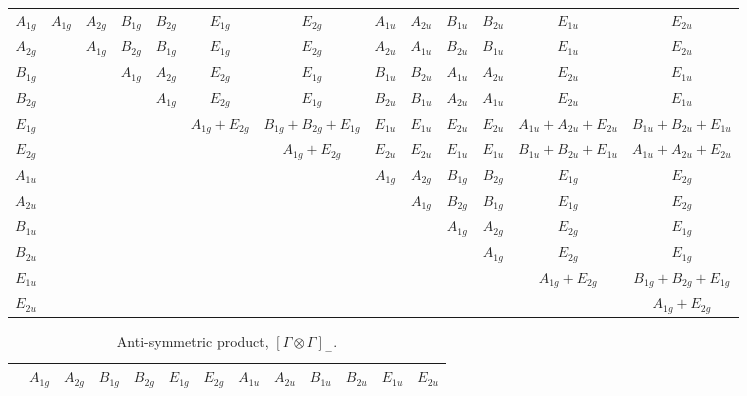 \documentclass[fleqn,10pt,landscape]{article}
\begin{document}
\begin{itemize}
\begin{center}
\begin{longtable}{c|cccccccccccc}
$ A_{1g} $ & $ A_{1g} $ & $ A_{2g} $ & $ B_{1g} $ & $ B_{2g} $ & $ E_{1g} $ & $ E_{2g} $ & $ A_{1u} $ & $ A_{2u} $ & $ B_{1u} $ & $ B_{2u} $ & $ E_{1u} $ & $ E_{2u} $ \\
$ A_{2g} $ & $  $ & $ A_{1g} $ & $ B_{2g} $ & $ B_{1g} $ & $ E_{1g} $ & $ E_{2g} $ & $ A_{2u} $ & $ A_{1u} $ & $ B_{2u} $ & $ B_{1u} $ & $ E_{1u} $ & $ E_{2u} $ \\
$ B_{1g} $ & $  $ & $  $ & $ A_{1g} $ & $ A_{2g} $ & $ E_{2g} $ & $ E_{1g} $ & $ B_{1u} $ & $ B_{2u} $ & $ A_{1u} $ & $ A_{2u} $ & $ E_{2u} $ & $ E_{1u} $ \\
$ B_{2g} $ & $  $ & $  $ & $  $ & $ A_{1g} $ & $ E_{2g} $ & $ E_{1g} $ & $ B_{2u} $ & $ B_{1u} $ & $ A_{2u} $ & $ A_{1u} $ & $ E_{2u} $ & $ E_{1u} $ \\
$ E_{1g} $ & $  $ & $  $ & $  $ & $  $ & $ A_{1g} + E_{2g} $ & $ B_{1g} + B_{2g} + E_{1g} $ & $ E_{1u} $ & $ E_{1u} $ & $ E_{2u} $ & $ E_{2u} $ & $ A_{1u} + A_{2u} + E_{2u} $ & $ B_{1u} + B_{2u} + E_{1u} $ \\
$ E_{2g} $ & $  $ & $  $ & $  $ & $  $ & $  $ & $ A_{1g} + E_{2g} $ & $ E_{2u} $ & $ E_{2u} $ & $ E_{1u} $ & $ E_{1u} $ & $ B_{1u} + B_{2u} + E_{1u} $ & $ A_{1u} + A_{2u} + E_{2u} $ \\
$ A_{1u} $ & $  $ & $  $ & $  $ & $  $ & $  $ & $  $ & $ A_{1g} $ & $ A_{2g} $ & $ B_{1g} $ & $ B_{2g} $ & $ E_{1g} $ & $ E_{2g} $ \\
$ A_{2u} $ & $  $ & $  $ & $  $ & $  $ & $  $ & $  $ & $  $ & $ A_{1g} $ & $ B_{2g} $ & $ B_{1g} $ & $ E_{1g} $ & $ E_{2g} $ \\
$ B_{1u} $ & $  $ & $  $ & $  $ & $  $ & $  $ & $  $ & $  $ & $  $ & $ A_{1g} $ & $ A_{2g} $ & $ E_{2g} $ & $ E_{1g} $ \\
$ B_{2u} $ & $  $ & $  $ & $  $ & $  $ & $  $ & $  $ & $  $ & $  $ & $  $ & $ A_{1g} $ & $ E_{2g} $ & $ E_{1g} $ \\
$ E_{1u} $ & $  $ & $  $ & $  $ & $  $ & $  $ & $  $ & $  $ & $  $ & $  $ & $  $ & $ A_{1g} + E_{2g} $ & $ B_{1g} + B_{2g} + E_{1g} $ \\
$ E_{2u} $ & $  $ & $  $ & $  $ & $  $ & $  $ & $  $ & $  $ & $  $ & $  $ & $  $ & $  $ & $ A_{1g} + E_{2g} $ \\
\end{longtable}
\end{center}
\begin{center}
\renewcommand{\arraystretch}{1.0}
\begin{longtable}{ccccccccccccc}
\caption{Anti-symmetric product, $[\Gamma\otimes\Gamma]_-$.}
 \\
 \hline \hline
 & $ A_{1g} $ & $ A_{2g} $ & $ B_{1g} $ & $ B_{2g} $ & $ E_{1g} $ & $ E_{2g} $ & $ A_{1u} $ & $ A_{2u} $ & $ B_{1u} $ & $ B_{2u} $ & $ E_{1u} $ & $ E_{2u} $ \\ \hline \endfirsthead


\end{longtable}
\end{center}
\end{itemize}
\end{document}
